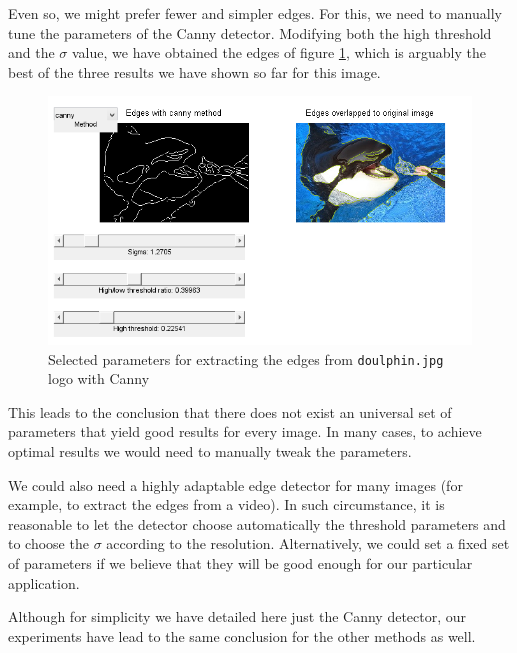 Even so, we might prefer fewer and simpler edges. For this, we need to
manually tune the parameters of the Canny detector. Modifying both the
high threshold and the $\sigma$ value, we have obtained the edges of figure
\ref{fig:cannydoulphinselected}, which is arguably the best of the three results
we have shown so far for this image.

\begin{figure}[!hbt]
  \includegraphics[width=\textwidth]{./img/ex1/canny_doulphin_best.png}
  \caption{Selected parameters for extracting the edges from \texttt{doulphin.jpg} logo with Canny}
  \label{fig:cannydoulphinselected}
\end{figure}

This leads to the conclusion that there does not exist an universal set of
parameters that yield good results for every image. In many cases, to achieve
optimal results we would need to manually tweak the parameters.

We could also need a highly adaptable edge detector for many images
(for example, to extract the edges from a video). In such circumstance,
it is reasonable to let the detector choose automatically the threshold
parameters and to choose the $\sigma$ according to the resolution. Alternatively,
we could set a fixed set of parameters if we believe that they will be good
enough for our particular application.

Although for simplicity we have detailed here just the Canny detector, our
experiments have lead to the same conclusion for the other methods as well.
